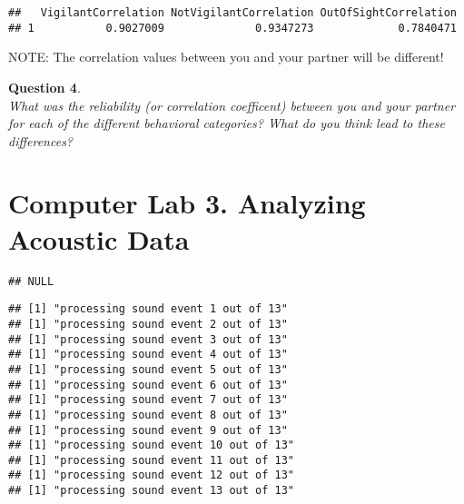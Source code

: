 \documentclass[]{book}
\newenvironment{Shaded}{\begin{snugshade}}{\end{snugshade}}
\newcommand{\CommentTok}[1]{\textcolor[rgb]{0.56,0.35,0.01}{\textit{#1}}}
\newcommand{\KeywordTok}[1]{\textcolor[rgb]{0.13,0.29,0.53}{\textbf{#1}}}
\newcommand{\NormalTok}[1]{#1}
\newcommand{\OperatorTok}[1]{\textcolor[rgb]{0.81,0.36,0.00}{\textbf{#1}}}
\newcommand{\StringTok}[1]{\textcolor[rgb]{0.31,0.60,0.02}{#1}}
\begin{document}
\begin{Shaded}
\end{Shaded}

\begin{verbatim}
##   VigilantCorrelation NotVigilantCorrelation OutOfSightCorrelation
## 1           0.9027009              0.9347273             0.7840471
\end{verbatim}

NOTE: The correlation values between you and your partner will be different!

\textbf{Question 4}.\\
\emph{What was the reliability (or correlation coefficent) between you and your partner for each of the different behavioral categories? What do you think lead to these differences? }

\hypertarget{computer-lab-3.-analyzing-acoustic-data}{%
\chapter*{Computer Lab 3. Analyzing Acoustic Data}\label{computer-lab-3.-analyzing-acoustic-data}}

\begin{verbatim}
## NULL
\end{verbatim}

\begin{verbatim}
## [1] "processing sound event 1 out of 13"
## [1] "processing sound event 2 out of 13"
## [1] "processing sound event 3 out of 13"
## [1] "processing sound event 4 out of 13"
## [1] "processing sound event 5 out of 13"
## [1] "processing sound event 6 out of 13"
## [1] "processing sound event 7 out of 13"
## [1] "processing sound event 8 out of 13"
## [1] "processing sound event 9 out of 13"
## [1] "processing sound event 10 out of 13"
## [1] "processing sound event 11 out of 13"
## [1] "processing sound event 12 out of 13"
## [1] "processing sound event 13 out of 13"
\end{verbatim}
\end{document}
